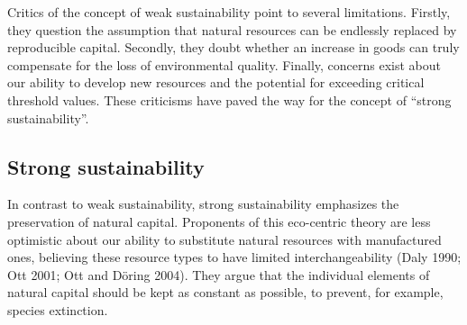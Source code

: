 \documentclass[
  a4paper,
  DIV=11,
  numbers=noendperiod,
  oneside,
  openany]{scrreprt}
\begin{document}
Critics of the concept of weak sustainability point to several
limitations. Firstly, they question the assumption that natural
resources can be endlessly replaced by reproducible capital. Secondly,
they doubt whether an increase in goods can truly compensate for the
loss of environmental quality. Finally, concerns exist about our ability
to develop new resources and the potential for exceeding critical
threshold values. These criticisms have paved the way for the concept of
``strong sustainability''.

\subsection{Strong sustainability}\label{strong-sustainability}

In contrast to weak sustainability, strong sustainability emphasizes the
preservation of natural capital. Proponents of this eco-centric theory
are less optimistic about our ability to substitute natural resources
with manufactured ones, believing these resource types to have limited
interchangeability (Daly 1990; Ott 2001; Ott and Döring 2004). They
argue that the individual elements of natural capital should be kept as
constant as possible, to prevent, for example, species extinction.

\begingroup\fontsize{8}{10}\selectfont
\end{document}
